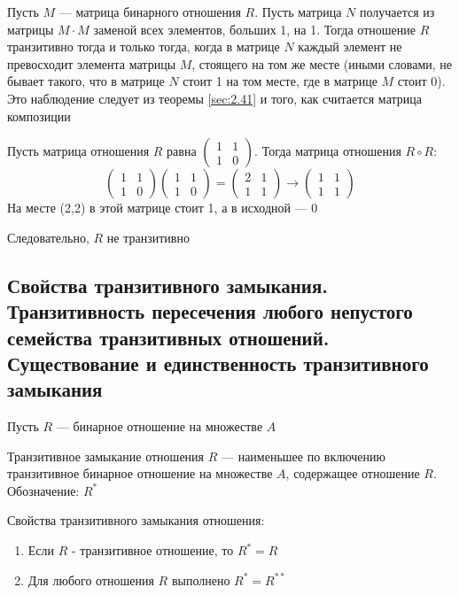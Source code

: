 \documentclass[a4paper]{article}
\begin{document}
Пусть $M$ — матрица бинарного отношения $R$. Пусть матрица $N$ получается из матрицы $M\cdot M$ заменой всех элементов, больших 1, на 1. Тогда отношение $R$ транзитивно тогда и только тогда, когда в матрице $N$ каждый элемент не превосходит элемента матрицы $M$, стоящего на том же месте (иными словами, не бывает такого, что в матрице $N$ стоит 1 на том месте, где в матрице $M$ стоит 0). Это наблюдение следует из теоремы \ref{sec:2.41} и того, как считается матрица композиции

\ex Пусть матрица отношения $R$ равна $\begin{pmatrix}
    1&1\\
    1&0
\end{pmatrix}$. Тогда матрица отношения $R\circ R:$
\begin{equation*}
    \begin{pmatrix}
        1&1\\
        1&0
    \end{pmatrix}\begin{pmatrix}
        1&1\\
        1&0
    \end{pmatrix}=\begin{pmatrix}
        2&1\\
        1&1
    \end{pmatrix}\rightarrow\begin{pmatrix}
        1&1\\
        1&1
    \end{pmatrix}
\end{equation*}
На месте (2,2) в этой матрице стоит 1, а в исходной — 0

Следовательно, $R$ не транзитивно

\subsection{Свойства транзитивного замыкания. Транзитивность пересечения любого непустого семейства транзитивных отношений. Существование и единственность транзитивного замыкания}
Пусть $R$ — бинарное отношение на множестве $A$

 Транзитивное замыкание отношения $R$ — наименьшее по включению транзитивное бинарное отношение на множестве $A$, содержащее отношение $R$. Обозначение: $R^*$

\label{sec:1.62}Свойства транзитивного замыкания отношения:
\begin{enumerate}
    \item Если $R$ - транзитивное отношение, то $R^*=R$
    \item Для любого отношения $R$ выполнено $R^*=R^{**}$
\end{enumerate}
\end{document}

